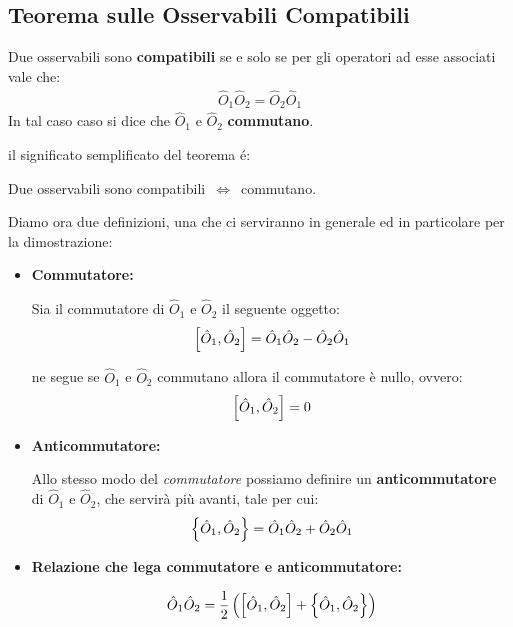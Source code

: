 \subsection{Teorema sulle Osservabili Compatibili}

\begin{myth}
	Due osservabili sono \textbf{compatibili} se e solo se per gli operatori ad esse associati vale che:
\begin{align*}
	\hat{O}_1\hat{O}_2 = \hat{O}_2\hat{O}_1
\end{align*}
	In tal caso caso si dice che $\hat{O}_1$ e $\hat{O}_2$ \textbf{commutano}.
\end{myth}

	il significato semplificato del teorema é:
	
\begin{nb}
	Due osservabili sono compatibili $ \, \Leftrightarrow \, $ commutano.
\end{nb}

	Diamo ora due definizioni, una che ci serviranno in generale ed in particolare per la dimostrazione:
	
\begin{itemize}

	\item \textbf{Commutatore:}
\begin{mydef}
	Sia il commutatore di $\hat{O}_1$ e $\hat{O}_2$ il seguente oggetto:
\begin{align*}
	\qty[\hat{O}_1, \hat{O}_2 ] = \hat{O}_1\hat{O}_2 - \hat{O}_2\hat{O}_1
\end{align*}
\end{mydef}
	ne segue se $\hat{O}_1$ e $\hat{O}_2$ commutano allora il commutatore è nullo, ovvero:
\begin{align*}
	\qty[\hat{O}_1, \hat{O}_2 ] = 0
\end{align*}
	
	\item \textbf{Anticommutatore:}
\begin{mydef}
	Allo stesso modo del \textit{commutatore} possiamo definire un \textbf{anticommutatore} di $\hat{O}_1$ e $\hat{O}_2$, che servirà più avanti, tale per cui:
\begin{align*}
	\qty{\hat{O}_1, \hat{O}_2 } = \hat{O}_1\hat{O}_2 + \hat{O}_2\hat{O}_1
\end{align*}
\end{mydef}

	\item \textbf{Relazione che lega commutatore e anticommutatore:}
\begin{mydef}
\begin{align*}
	\hat{O}_1\hat{O}_2 = \frac{1}{2} \, \qty( \qty[\hat{O}_1, \hat{O}_2] + \qty{\hat{O}_1, \hat{O}_2})
\end{align*}
\end{mydef}
	
\end{itemize}

